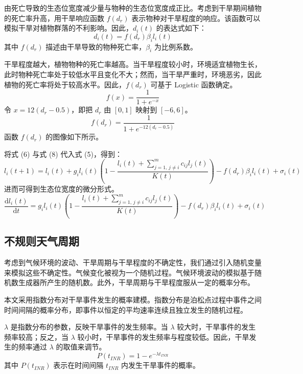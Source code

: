 \documentclass[11pt,a4paper]{ctexart}
\begin{document}
由死亡导致的生态位宽度减少量与物种的生态位宽度成正比。考虑到干旱期间植物的死亡率升高，用干旱响应函数 $f(d_r)$ 表示物种对干旱程度的响应。该函数可以模拟干旱对植物群落的不利影响。因此，$d_i(t)$ 的表达式如下：
\begin{equation}
d_i(t)=f(d_r)\beta_i l_i(t)
\end{equation}
其中 $f(d_r)$ 描述由干旱导致的物种死亡率，$\beta_i$ 为比例系数。

干旱程度越大，植物物种的死亡率越高。当干旱程度较小时，环境适宜植物生长，此时物种死亡率处于较低水平且变化不大；然而，当干旱严重时，环境恶劣，因此植物的死亡率将处于较高水平。因此，$f(d_r)$ 可基于 Logistic 函数确定。
\begin{equation}
f(x)=\frac{1}{1+e^{-x}}
\end{equation}
令 $x=12(d_r-0.5)$，即把 $d_r$ 由 $[0,1]$ 映射到 $[-6,6]$。
\begin{equation}
f(d_r)=\frac{1}{1+e^{-12(d_r-0.5)}}
\end{equation}
函数 $f(d_r)$ 的图像如下所示。

将式 (6) 与式 (8) 代入式 (5)，得到：
\begin{equation}
l_i(t+1)=l_i(t)+g_i l_i(t)\left(1-\frac{l_i(t)+\sum_{j=1,\,j\neq i}^{m}c_{ij}l_j(t)}{K(t)}\right)-f(d_r)\beta_i l_i(t)+\sigma_i(t)
\end{equation}
进而可得到生态位宽度的微分形式。
\begin{equation}
\frac{\mathrm{d}l_i(t)}{\mathrm{d}t}=g_i l_i(t)\left(1-\frac{l_i(t)+\sum_{j=1,\,j\neq i}^{m}c_{ij}l_j(t)}{K(t)}\right)-f(d_r)\beta_i l_i(t)+\sigma_i(t)
\end{equation}

\subsection{不规则天气周期}

考虑到气候环境的波动、干旱周期与干旱程度的不确定性，我们通过引入随机变量来模拟这些不确定性。气候变化被视为一个随机过程。气候环境波动的模拟基于随机数生成器所产生的随机数。此外，干旱周期与干旱程度服从一定的概率分布。

本文采用指数分布对干旱事件发生的概率建模。指数分布是泊松点过程中事件之间时间间隔的概率分布，即事件以恒定的平均速率连续且独立发生的随机过程。

$\lambda$ 是指数分布的参数，反映干旱事件的发生频率。当 $\lambda$ 较大时，干旱事件的发生频率较高；反之，当 $\lambda$ 较小时，干旱事件的发生频率与程度较低。因此，干旱发生的频率通过 $\lambda$ 的取值来调节。
\begin{equation}
P(t_{INR})=1-e^{-\lambda t_{INR}}
\end{equation}
其中 $P(t_{INR})$ 表示在时间间隔 $t_{INR}$ 内发生干旱事件的概率。
\end{document}
